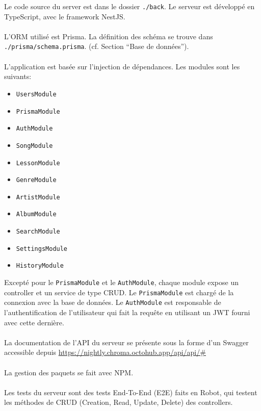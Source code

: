 Le code source du server est dans le dossier \texttt{./back}. Le serveur est développé en TypeScript, avec le framework NestJS.
\\\\
L’ORM utilisé est Prisma. La définition des schéma se trouve dans \texttt{./prisma/schema.prisma}. (cf. Section “Base de données”).
\\\\
L’application est basée sur l'injection de dépendances. Les modules sont les suivants:

\begin{itemize}
	\item \texttt{UsersModule}
	\item \texttt{PrismaModule}
	\item \texttt{AuthModule}
	\item \texttt{SongModule}
	\item \texttt{LessonModule}
	\item \texttt{GenreModule}
	\item \texttt{ArtistModule}
	\item \texttt{AlbumModule}
	\item \texttt{SearchModule}
	\item \texttt{SettingsModule}
	\item \texttt{HistoryModule}
\end{itemize}


Excepté pour le \texttt{PrismaModule} et le \texttt{AuthModule}, chaque module expose un controller et un service de type CRUD.
Le \texttt{PrismaModule} est chargé de la connexion avec la base de données. Le \texttt{AuthModule} est responsable de l'authentification de l’utilisateur qui fait la requête en utilisant un JWT fourni avec cette dernière.
\\\\
La documentation de l’API du serveur se présente sous la forme d’un Swagger accessible depuis \href{https://nightly.chroma.octohub.app/api/api/#}{https://nightly.chroma.octohub.app/api/api/\#}
\\\\
La gestion des paquets se fait avec NPM.
\\\\
Les tests du serveur sont des tests End-To-End (E2E) faits en Robot, qui testent les méthodes de CRUD (Creation, Read, Update, Delete) des controllers. 
